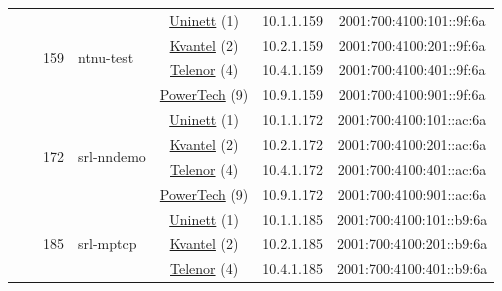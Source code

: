\begin{small}
\begin{center}
\begin{longtable}{|c|c|c|c|c|c|c|c|}
  &  & \multirow{4}{*}{\tiny{159}} & \multicolumn{1}{|l|}{\multirow{4}{*}{\tiny{ntnu-test}}} & \multicolumn{2}{|c|}{\tiny{\href{https://www.uninett.no}{Uninett} (1)}} & \tiny{10.1.1.159} & \tiny{2001:700:4100:101::9f:6a} \\* \cline{5-5}\cline{6-6}\cline{7-7}\cline{8-8}
  &  &  &  & \multicolumn{2}{|c|}{\tiny{\href{http://kvantel.no}{Kvantel} (2)}} & \tiny{10.2.1.159} & \tiny{2001:700:4100:201::9f:6a} \\* \cline{5-5}\cline{6-6}\cline{7-7}\cline{8-8}
  &  &  &  & \multicolumn{2}{|c|}{\tiny{\href{https://www.telenor.no}{Telenor} (4)}} & \tiny{10.4.1.159} & \tiny{2001:700:4100:401::9f:6a} \\* \cline{5-5}\cline{6-6}\cline{7-7}\cline{8-8}
  &  &  &  & \multicolumn{2}{|c|}{\tiny{\href{http://www.powertech.no}{PowerTech} (9)}} & \tiny{10.9.1.159} & \tiny{2001:700:4100:901::9f:6a} \\* \cline{3-3}\cline{4-4}\cline{5-5}\cline{6-6}\cline{7-7}\cline{8-8}
  &  & \multirow{4}{*}{\tiny{172}} & \multicolumn{1}{|l|}{\multirow{4}{*}{\tiny{srl-nndemo}}} & \multicolumn{2}{|c|}{\tiny{\href{https://www.uninett.no}{Uninett} (1)}} & \tiny{10.1.1.172} & \tiny{2001:700:4100:101::ac:6a} \\* \cline{5-5}\cline{6-6}\cline{7-7}\cline{8-8}
  &  &  &  & \multicolumn{2}{|c|}{\tiny{\href{http://kvantel.no}{Kvantel} (2)}} & \tiny{10.2.1.172} & \tiny{2001:700:4100:201::ac:6a} \\* \cline{5-5}\cline{6-6}\cline{7-7}\cline{8-8}
  &  &  &  & \multicolumn{2}{|c|}{\tiny{\href{https://www.telenor.no}{Telenor} (4)}} & \tiny{10.4.1.172} & \tiny{2001:700:4100:401::ac:6a} \\* \cline{5-5}\cline{6-6}\cline{7-7}\cline{8-8}
  &  &  &  & \multicolumn{2}{|c|}{\tiny{\href{http://www.powertech.no}{PowerTech} (9)}} & \tiny{10.9.1.172} & \tiny{2001:700:4100:901::ac:6a} \\* \cline{3-3}\cline{4-4}\cline{5-5}\cline{6-6}\cline{7-7}\cline{8-8}
  &  & \multirow{4}{*}{\tiny{185}} & \multicolumn{1}{|l|}{\multirow{4}{*}{\tiny{srl-mptcp}}} & \multicolumn{2}{|c|}{\tiny{\href{https://www.uninett.no}{Uninett} (1)}} & \tiny{10.1.1.185} & \tiny{2001:700:4100:101::b9:6a} \\* \cline{5-5}\cline{6-6}\cline{7-7}\cline{8-8}
  &  &  &  & \multicolumn{2}{|c|}{\tiny{\href{http://kvantel.no}{Kvantel} (2)}} & \tiny{10.2.1.185} & \tiny{2001:700:4100:201::b9:6a} \\* \cline{5-5}\cline{6-6}\cline{7-7}\cline{8-8}
  &  &  &  & \multicolumn{2}{|c|}{\tiny{\href{https://www.telenor.no}{Telenor} (4)}} & \tiny{10.4.1.185} & \tiny{2001:700:4100:401::b9:6a} \\* \cline{5-5}\cline{6-6}\cline{7-7}\cline{8-8}

\end{longtable}
\end{center}
\end{small}
